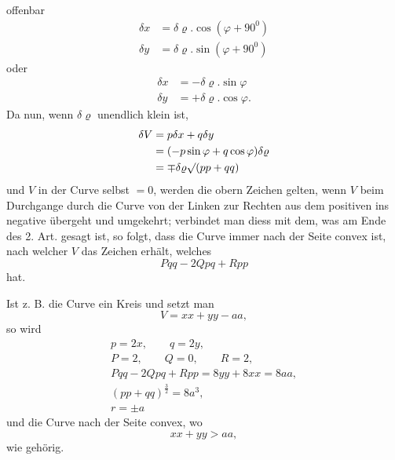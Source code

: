 %
offenbar
\[
\begin{aligned}
\delta x&=\delta\varrho.\cos(\varphi+90^{0})\\
\delta y&=\delta\varrho.\sin(\varphi+90^{0})
\end{aligned}
\]
oder
\[
\begin{aligned}
\delta x&=-\delta\varrho.\sin\varphi\\
\delta y&=+\delta\varrho.\cos\varphi.
\end{aligned}
\]
Da nun, wenn $\delta\varrho$ unendlich klein ist,
\[
\begin{aligned}
\delta V&=p\delta x+q\delta y\\
&=(-p\sin\varphi+q\cos\varphi)\delta\varrho\\
&=\mp\delta\varrho\mathord{\surd}(pp+qq)
\end{aligned}
\]
und $V$ in der Curve selbst $=0$, werden die obern Zeichen gelten, wenn $V$ beim Durchgange durch die Curve von der Linken zur Rechten aus dem positiven ins negative übergeht und umgekehrt; verbindet man diess mit dem, was am Ende des 2. Art. gesagt ist, so folgt, dass die Curve immer nach der Seite convex ist, nach welcher $V$ das Zeichen erhält, welches
\[
Pqq-2Qpq+Rpp
\]
hat.

Ist z. B. die Curve ein Kreis und setzt man
\[
V=xx+yy-aa,
\]
so wird
\[
\begin{gathered}
p=2x,\qquad q=2y,\\
P=2,\qquad Q=0,\qquad R=2,\\
Pqq-2Qpq+Rpp=8yy+8xx=8aa,\\
(pp+qq)^{\frac32}=8a^3,\\
r=\pm a
\end{gathered}
\]
und die Curve nach der Seite convex, wo
\[
xx+yy>aa,
\]
wie gehörig.
